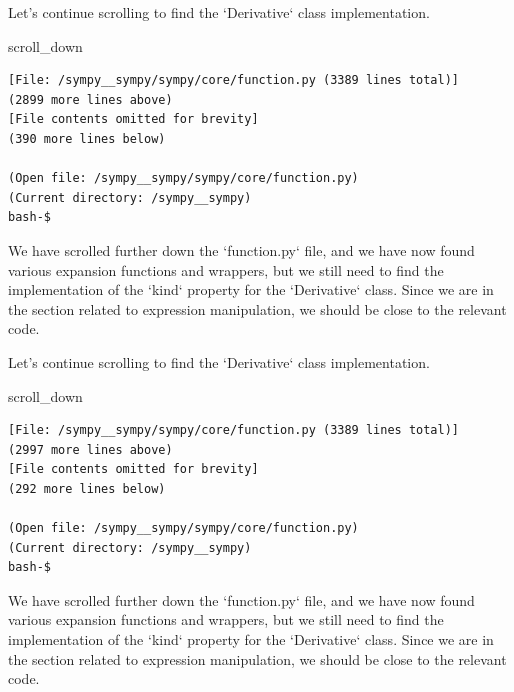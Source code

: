 {\begin{agentbox}
Let's continue scrolling to find the `Derivative` class implementation.



\hrulefill
\begin{CodeVerbatim}[breaklines=true, breakanywhere=true]
scroll_down
\end{CodeVerbatim}
\end{agentbox}
\begin{observationbox}\begin{Verbatim}[breaklines=true, breakanywhere=true]
[File: /sympy__sympy/sympy/core/function.py (3389 lines total)]
(2899 more lines above)
[File contents omitted for brevity]
(390 more lines below)

(Open file: /sympy__sympy/sympy/core/function.py)
(Current directory: /sympy__sympy)
bash-$
\end{Verbatim}
\end{observationbox}
\begin{agentbox}
We have scrolled further down the `function.py` file, and we have now found various expansion functions and wrappers, but we still need to find the implementation of the `kind` property for the `Derivative` class. Since we are in the section related to expression manipulation, we should be close to the relevant code.



Let's continue scrolling to find the `Derivative` class implementation.



\hrulefill
\begin{CodeVerbatim}[breaklines=true, breakanywhere=true]
scroll_down
\end{CodeVerbatim}
\end{agentbox}
\begin{observationbox}\begin{Verbatim}[breaklines=true, breakanywhere=true]
[File: /sympy__sympy/sympy/core/function.py (3389 lines total)]
(2997 more lines above)
[File contents omitted for brevity]
(292 more lines below)

(Open file: /sympy__sympy/sympy/core/function.py)
(Current directory: /sympy__sympy)
bash-$
\end{Verbatim}
\end{observationbox}
\begin{agentbox}
We have scrolled further down the `function.py` file, and we have now found various expansion functions and wrappers, but we still need to find the implementation of the `kind` property for the `Derivative` class. Since we are in the section related to expression manipulation, we should be close to the relevant code.




\end{agentbox}}
